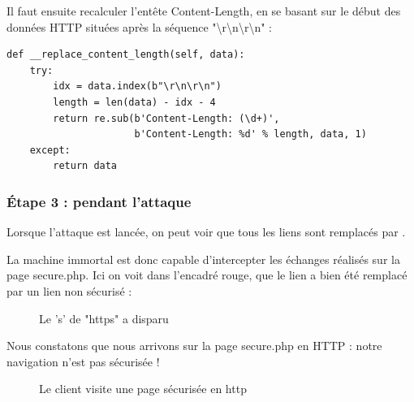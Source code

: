 Il faut ensuite recalculer l'entête Content-Length, en se basant sur le début des données HTTP situées après la séquence "{\textbackslash}r{\textbackslash}n{\textbackslash}r{\textbackslash}n" :

\begin{verbatim}
def __replace_content_length(self, data):
    try:
        idx = data.index(b"\r\n\r\n")
        length = len(data) - idx - 4
        return re.sub(b'Content-Length: (\d+)',
                      b'Content-Length: %d' % length, data, 1)
    except:
        return data
\end{verbatim}

\subsubsection{Étape 3 : pendant l'attaque}

Lorsque l'attaque est lancée, on peut voir que tous les liens  sont remplacés par .

La machine immortal est donc capable d'intercepter les échanges réalisés sur la page secure.php. Ici on voit dans l'encadré rouge, que le lien  a bien été remplacé par un lien non sécurisé  :

\begin{figure}[H]
  \caption{Le 's' de "https" a disparu}
\end{figure}

Nous constatons que nous arrivons sur la page secure.php en HTTP : notre navigation n'est pas sécurisée !

\begin{figure}[H]
  \caption{Le client visite une page sécurisée en http}
\end{figure}

